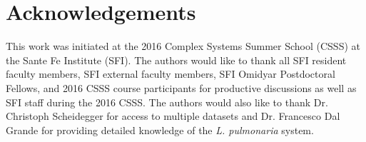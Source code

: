 \documentclass[runningheads,a4paper]{llncs}
\begin{document}
%

%

%

\section*{Acknowledgements}
This work was initiated at the 2016 Complex Systems Summer School (CSSS) at the Sante Fe Institute (SFI). The authors would like to thank all SFI resident faculty members, SFI external faculty members, SFI Omidyar Postdoctoral Fellows, and 2016 CSSS course participants for productive discussions as well as SFI staff during the 2016 CSSS. The authors would also like to thank Dr. Christoph Scheidegger for access to multiple datasets and Dr. Francesco Dal Grande for providing detailed knowledge of the \emph{L. pulmonaria} system. 


%

\end{document}
